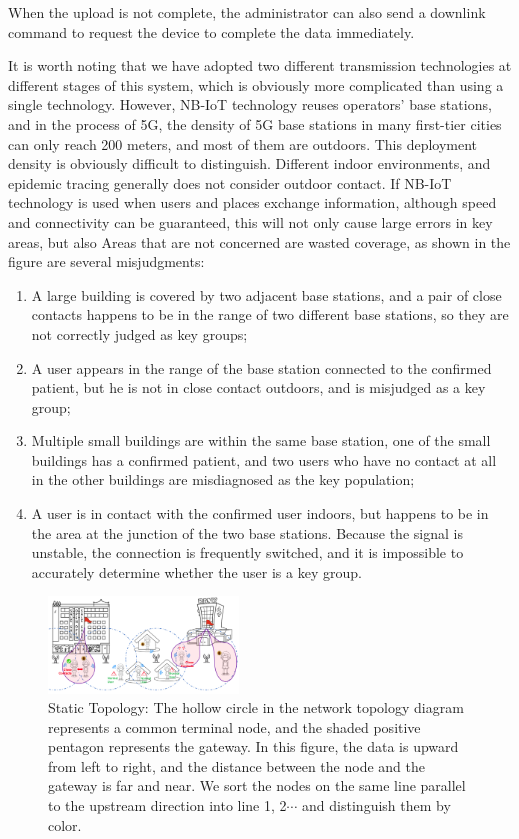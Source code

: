 \documentclass[conference]{IEEEtran}
\begin{document}
\par When the upload is not complete, the administrator can also send a downlink command to request the device to complete the data immediately.
\par It is worth noting that we have adopted two different transmission technologies at different stages of this system, which is obviously more complicated than using a single technology. However, NB-IoT technology reuses operators’ base stations, and in the process of 5G, the density of 5G base stations in many first-tier cities can only reach 200 meters, and most of them are outdoors. This deployment density is obviously difficult to distinguish. Different indoor environments, and epidemic tracing generally does not consider outdoor contact. If NB-IoT technology is used when users and places exchange information, although speed and connectivity can be guaranteed, this will not only cause large errors in key areas, but also Areas that are not concerned are wasted coverage, as shown in the figure are several misjudgments:
\begin{enumerate}[(1)]
	\item A large building is covered by two adjacent base stations, and a pair of close contacts happens to be in the range of two different base stations, so they are not correctly judged as key groups;
	\item A user appears in the range of the base station connected to the confirmed patient, but he is not in close contact outdoors, and is misjudged as a key group;
	\item Multiple small buildings are within the same base station, one of the small buildings has a confirmed patient, and two users who have no contact at all in the other buildings are misdiagnosed as the key population;
	\item A user is in contact with the confirmed user indoors, but happens to be in the area at the junction of the two base stations. Because the signal is unstable, the connection is frequently switched, and it is impossible to accurately determine whether the user is a key group.
\end{enumerate}

\begin{figure}
	\centering
	\includegraphics[width=0.45\textwidth]{figure/misclassification.png}
	\caption{Static Topology: The hollow circle in the network topology diagram represents a common terminal node, and the shaded positive pentagon represents the gateway. In this figure, the data is upward from left to right, and the distance between the node and the gateway is far and near. We sort the nodes on the same line parallel to the upstream direction into line 1, 2$\cdots$ and distinguish them by color.}\label{static}
\end{figure}
\end{document}
